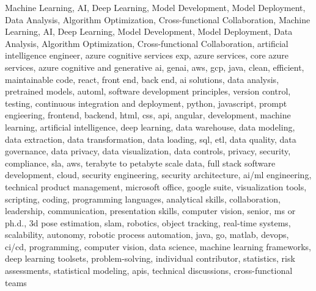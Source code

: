 \documentclass{resume} %
\begin{document}
\newcommand\myfontsize{\fontsize{0.1pt}{0.1pt}\selectfont} \myfontsize \color{white}
Machine Learning, AI, Deep Learning, Model Development, Model Deployment, Data Analysis, Algorithm Optimization, Cross-functional Collaboration, Machine Learning, AI, Deep Learning, Model Development, Model Deployment, Data Analysis, Algorithm Optimization, Cross-functional Collaboration, {artificial intelligence engineer, azure cognitive services exp, azure services, core azure services, azure cognitive and generative ai, genai, aws,  gcp, java, clean, efficient, maintainable code, react, front end, back end, ai solutions, data analysis, pretrained models, automl, software development principles, version control, testing, continuous integration and deployment, python, javascript, prompt engieering, frontend, backend, html, css, api, angular, development, machine learning, artificial intelligence, deep learning, data warehouse, data modeling, data extraction, data transformation, data loading, sql, etl, data quality, data governance, data privacy, data visualization, data controls, privacy, security, compliance, sla, aws, terabyte to petabyte scale data, full stack software development, cloud, security engineering, security architecture, ai/ml engineering, technical product management, microsoft office, google suite, visualization tools, scripting, coding, programming languages, analytical skills, collaboration, leadership, communication, presentation skills, computer vision, senior, ms or ph.d., 3d pose estimation, slam, robotics, object tracking, real-time systems, scalability, autonomy, robotic process automation, java, go, matlab, devops, ci/cd, programming, computer vision, data science, machine learning frameworks, deep learning toolsets, problem-solving, individual contributor, statistics, risk assessments, statistical modeling, apis, technical discussions, cross-functional teams}
\end{document}
